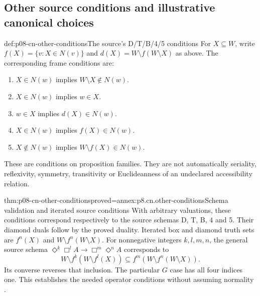 \subsection{Other source conditions and illustrative canonical choices}
\label{sec:p08-cn-other}

\begin{hbdefinition}{def:p08-cn-other-conditions}{The source's D/T/B/4/5 conditions}
For \(X\subseteq W\), write \(f(X)=\{v:X\in N(v)\}\)
and \(d(X)=W\setminus f(W\setminus X)\) as above.
The corresponding frame conditions are:
\begin{enumerate}
\item[(d)] \(X\in N(w)\) implies \(W\setminus X\notin N(w)\).
\item[(t)] \(X\in N(w)\) implies \(w\in X\).
\item[(b)] \(w\in X\) implies \(d(X)\in N(w)\).
\item[(iv)] \(X\in N(w)\) implies \(f(X)\in N(w)\).
\item[(v)] \(X\notin N(w)\) implies \(W\setminus f(X)\in N(w)\).
\end{enumerate}
These are conditions on proposition families. They are not
automatically seriality, reflexivity, symmetry, transitivity or
Euclideanness of an undeclared accessibility relation.
\end{hbdefinition}

\begin{hbtheorem}{thm:p08-cn-other-conditions}{proved=annex:p8.cn.other-conditions}{Schema validation and iterated source conditions}
With arbitrary valuations, these conditions correspond respectively
to the source schemas D, T, B, 4 and 5. Their diamond duals follow
by the proved duality. Iterated box and diamond truth sets are
\(f^n(X)\) and \(W\setminus f^n(W\setminus X)\).
For nonnegative integers \(k,l,m,n\), the general source schema
\(\Diamond^k\Box^l A\to\Box^m\Diamond^n A\)
corresponds to
\[
 W\setminus f^k(W\setminus f^l(X))
       \subseteq f^m(W\setminus f^n(W\setminus X)).
\]
Its converse reverses that inclusion. The particular \(G\)
case has all four indices one. This establishes the needed
operator conditions without assuming normality
\cite[sec.~7.4, pp.~223--226]{Chellas1980}.
\end{hbtheorem}

